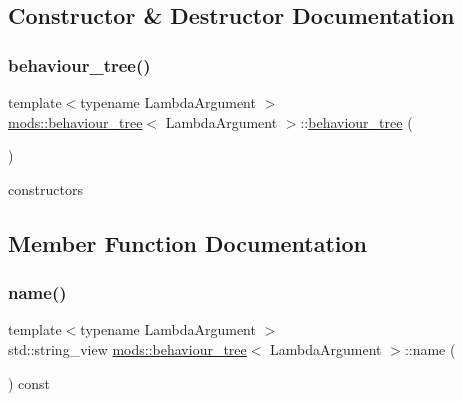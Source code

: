 \subsection{Constructor \& Destructor Documentation}
\mbox{\label{structmods_1_1behaviour__tree_aa178fd3ed7e5ff05f955a9e055d2f894}} 
\subsubsection{\texorpdfstring{behaviour\+\_\+tree()}{behaviour\_tree()}}
{\footnotesize\ttfamily template$<$typename Lambda\+Argument $>$ \\
\hyperlink{structmods_1_1behaviour__tree}{mods\+::behaviour\+\_\+tree}$<$ Lambda\+Argument $>$\+::\hyperlink{structmods_1_1behaviour__tree}{behaviour\+\_\+tree} (\begin{DoxyParamCaption}{ }\end{DoxyParamCaption})\hspace{0.3cm}{\ttfamily [inline]}}

constructors 

\subsection{Member Function Documentation}
\mbox{\label{structmods_1_1behaviour__tree_a5ae8521abb01c434dc3f057f8312ee66}} 
\subsubsection{\texorpdfstring{name()}{name()}}
{\footnotesize\ttfamily template$<$typename Lambda\+Argument $>$ \\
std\+::string\+\_\+view \hyperlink{structmods_1_1behaviour__tree}{mods\+::behaviour\+\_\+tree}$<$ Lambda\+Argument $>$\+::name (\begin{DoxyParamCaption}{ }\end{DoxyParamCaption}) const\hspace{0.3cm}{\ttfamily [inline]}}

